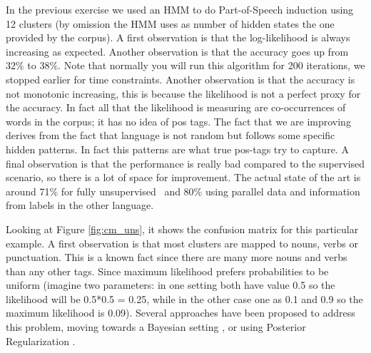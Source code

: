 In the previous exercise we used an HMM to do Part-of-Speech induction using 12 clusters (by omission the HMM uses as number 
of hidden states the one provided by the corpus). A first observation is that the log-likelihood is always increasing as expected. 
Another observation is that the accuracy goes up from 32\% to 38\%. 
Note that normally you will run this algorithm for 200 iterations, we stopped earlier for time constraints. 
Another observation is that the accuracy is not monotonic increasing, this is because the likelihood is not a perfect proxy 
for the accuracy. In fact all that the likelihood is measuring are co-occurrences of words in the corpus; it has no idea of pos tags. 
The fact that we are improving derives from the fact that language is not random but follows some specific hidden patterns. 
In fact this patterns are what true pos-tags try to capture. A final observation is that the performance is really bad 
compared to the supervised scenario, so there is a lot of space for improvement. The actual state of the 
art is around 71\% for fully unsupervised~\citep{JoaoThesis,bergkirkpatrick2010naacl} and 80\% \citep{das-petrov:2011:ACL-HLT2011} 
using parallel data and information from labels in the other language. 

Looking at Figure \ref{fig:cm_uns}, it shows the confusion matrix for this particular example. 
A first observation is that most clusters are mapped to nouns, verbs or punctuation. 
This is a known fact since there are many more nouns and verbs than any other tags. Since maximum likelihood prefers probabilities 
to be uniform (imagine two parameters: in one setting both have value 0.5 so the likelihood will be 0.5*0.5 = 0.25, 
while in the other case one as 0.1 and 0.9 so the maximum likelihood is 0.09). Several approaches have been proposed to 
address this problem, moving towards a Bayesian setting \citep{johnson2007dtf}, or using 
Posterior Regularization \citep{graca2009nips}. 











